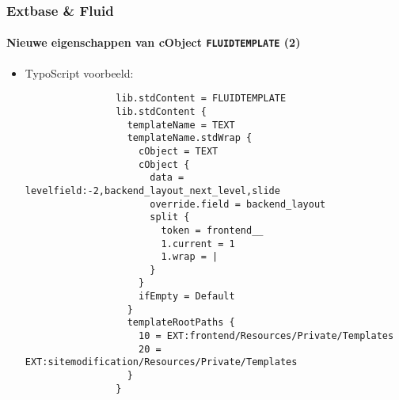 \begin{frame}[fragile]
	\frametitle{Extbase \& Fluid}
	\framesubtitle{Nieuwe eigenschappen van cObject \texttt{FLUIDTEMPLATE} (2)}

	\lstset{basicstyle=\tiny\ttfamily}

	\begin{itemize}

		\item TypoScript voorbeeld:

			\begin{lstlisting}
				lib.stdContent = FLUIDTEMPLATE
				lib.stdContent {
				  templateName = TEXT
				  templateName.stdWrap {
				    cObject = TEXT
				    cObject {
				      data = levelfield:-2,backend_layout_next_level,slide
				      override.field = backend_layout
				      split {
				        token = frontend__
				        1.current = 1
				        1.wrap = |
				      }
				    }
				    ifEmpty = Default
				  }
				  templateRootPaths {
				    10 = EXT:frontend/Resources/Private/Templates
				    20 = EXT:sitemodification/Resources/Private/Templates
				  }
				}
			\end{lstlisting}

	\end{itemize}

\end{frame}


